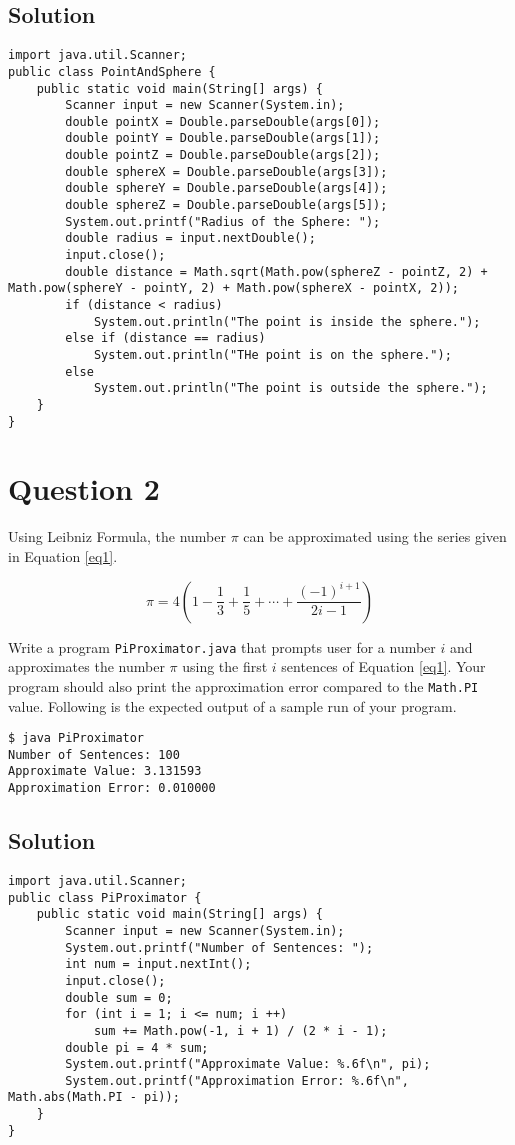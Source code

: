 \subsection*{Solution}
\lstset{language=Java,tabsize=2}
\begin{lstlisting}
import java.util.Scanner;
public class PointAndSphere {
	public static void main(String[] args) {
		Scanner input = new Scanner(System.in);
		double pointX = Double.parseDouble(args[0]);
		double pointY = Double.parseDouble(args[1]);
		double pointZ = Double.parseDouble(args[2]);
		double sphereX = Double.parseDouble(args[3]);
		double sphereY = Double.parseDouble(args[4]);
		double sphereZ = Double.parseDouble(args[5]);
		System.out.printf("Radius of the Sphere: ");
		double radius = input.nextDouble();
		input.close();
		double distance = Math.sqrt(Math.pow(sphereZ - pointZ, 2) + Math.pow(sphereY - pointY, 2) + Math.pow(sphereX - pointX, 2));
		if (distance < radius)
			System.out.println("The point is inside the sphere.");
		else if (distance == radius)
			System.out.println("THe point is on the sphere.");
		else
			System.out.println("The point is outside the sphere.");
	}
}
\end{lstlisting}

\section*{Question 2}
Using Leibniz Formula, the number $\pi$ can be approximated using the series given in Equation \ref{eq1}.

\begin{equation}
\pi = 4 \left( 1 - \frac{1}{3} + \frac{1}{5} + \cdots + \frac{(-1)^{i+1}}{2i-1} \right)
\label{eq1}
\end{equation}

Write a program \texttt{PiProximator.java} that prompts user for a number $i$ and approximates the number $\pi$ using the first $i$ sentences of Equation \ref{eq1}.
Your program should also print the approximation error compared to the \texttt{Math.PI} value.
Following is the expected output of a sample run of your program.

\begin{verbatim}
$ java PiProximator
Number of Sentences: 100
Approximate Value: 3.131593
Approximation Error: 0.010000
\end{verbatim}

\subsection*{Solution}
\lstset{language=Java,tabsize=2}
\begin{lstlisting}
import java.util.Scanner;
public class PiProximator {
	public static void main(String[] args) {
		Scanner input = new Scanner(System.in);
		System.out.printf("Number of Sentences: ");
		int num = input.nextInt();
		input.close();
		double sum = 0;
		for (int i = 1; i <= num; i ++)
			sum += Math.pow(-1, i + 1) / (2 * i - 1);
		double pi = 4 * sum;
		System.out.printf("Approximate Value: %.6f\n", pi);
		System.out.printf("Approximation Error: %.6f\n", Math.abs(Math.PI - pi));
	}
}
\end{lstlisting}

